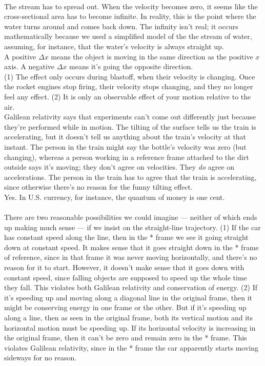\noindent{}\\
 The stream has to spread out. When the velocity becomes zero,
it seems like the cross-sectional area has to become infinite. In reality, this is the point
where the water turns around and comes back down. The infinity isn't real; it occurs
mathematically because we used a simplified model of the the stream of water, assuming,
for instance, that the water's velocity is always straight up.\\
 A positive $\Delta x$ means the object is moving in the same
direction as the positive $x$ axis. A negative $\Delta x$ means it's going the opposite
direction.\\
(1) The effect only occurs during blastoff, when their velocity is changing. Once
 the rocket engines stop firing, their
velocity stops changing, and they no longer feel any effect. (2) It
 is only an observable effect of your motion relative
to the air.\\
Galilean relativity says that experiments can't come out differently
just because they're performed while in motion. The tilting of the surface tells us the
train is accelerating, but it doesn't tell us anything about the train's velocity at that
instant. The person in the train might say the bottle's velocity was zero (but changing),
whereas a person
working in a reference frame attached to the dirt outside says it's moving; they don't
agree on velocities. They \emph{do} agree on accelerations. The person in the train
has to agree that the train is accelerating, since otherwise there's no reason for the
funny tilting effect. \\
Yes. In U.S. currency, for instance, the quantum of money
is one cent.\\

\noindent{}\\
There are two reasonable possibilities we could imagine --- neither of which ends
up making much sense --- if we insist on the straight-line trajectory.
(1) If the car has constant speed along the line, then in the * frame we see it
going straight down at constant speed. It makes sense that it goes straight down
in the * frame of reference, since in that frame it was
never moving horizontally, and there's no reason for it to start. However, it
doesn't make sense that it goes down with constant speed, since falling objects
are supposed to speed up the whole time they fall. This violates both Galilean
relativity and conservation of energy.
(2) If it's speeding up and moving along a diagonal line in the
original frame, then it might be conserving energy in one frame or the other.
But if it's speeding up along a line, then as seen in the original frame, both 
its vertical motion and its horizontal motion must be speeding up.
If its horizontal velocity is increasing in the original frame, then it can't be zero
and remain zero in the * frame. This violates Galilean relativity, since in the *
frame the car apparently starts moving sideways for no reason.

